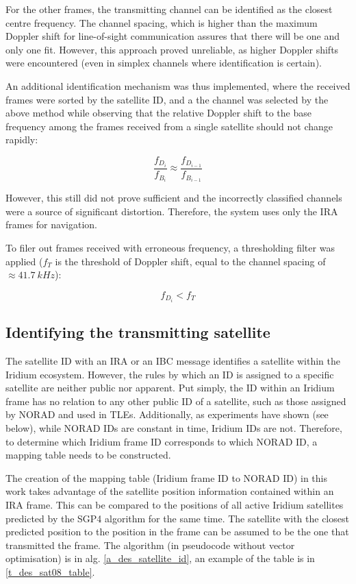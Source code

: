 For the other frames, the transmitting channel can be identified as the closest centre frequency. The channel spacing, which is higher than the maximum Doppler shift for line-of-sight communication assures that there will be one and only one fit. However, this approach proved unreliable, as higher Doppler shifts were encountered (even in simplex channels where identification is certain).

An additional identification mechanism was thus implemented, where the received frames were sorted by the satellite ID, and a the channel was selected by the above method while observing that the relative Doppler shift to the base frequency among the frames received from a single satellite should not change rapidly:

\begin{equation*}
    \frac{f_{D_i}}{f_{B_i}} \approx \frac{f_{D_{i-1}}}{f_{B_{i-1}}} 
\end{equation*}

However, this still did not prove sufficient and the incorrectly classified channels were a source of significant distortion. Therefore, the system uses only the IRA frames for navigation.

To filer out frames received with erroneous frequency, a thresholding filter was applied ($f_T$ is the threshold of Doppler shift, equal to the channel spacing of $\approx\qty{41.7}{kHz}$):

\begin{equation*}
    f_{D_i} < f_T
\end{equation*}

\subsection{Identifying the transmitting satellite}
The satellite ID with an IRA or an IBC message identifies a satellite within the Iridium ecosystem. However, the rules by which an ID is assigned to a specific satellite are neither public nor apparent. Put simply, the ID within an Iridium frame has no relation to any other public ID of a satellite, such as those assigned by NORAD and used in TLEs. Additionally, as experiments have shown (see below), while NORAD IDs are constant in time, Iridium IDs are not. Therefore, to determine which Iridium frame ID corresponds to which NORAD ID, a mapping table needs to be constructed.

The creation of the mapping table (Iridium frame ID to NORAD ID) in this work takes advantage of the satellite position information contained within an IRA frame. This can be compared to the positions of all active Iridium satellites predicted by the SGP4 algorithm for the same time. The satellite with the closest predicted position to the position in the frame can be assumed to be the one that transmitted the frame. The algorithm (in pseudocode without vector optimisation) is in alg. \ref{a_des_satellite_id}, an example of the table is in \autoref{t_des_sat08_table}.

